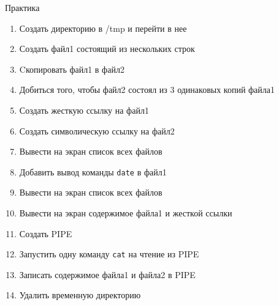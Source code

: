 \documentclass[ignorenonframetext, professionalfonts, hyperref={pdftex, unicode}]{beamer}
\begin{document}
\begin{frame}[fragile]{Практика}
	\begin{enumerate}
		\item Создать директорию в /tmp и перейти в нее
		\item Создать файл1 состоящий из нескольких строк
		\item Cкопировать файл1 в файл2
		\item Добиться того, чтобы файл2 состоял из 3 одинаковых копий файла1
		\item Создать жесткую ссылку на файл1
		\item Создать символическую ссылку на файл2
		\item Вывести на экран список всех файлов
		\item Добавить вывод команды {\tt date} в файл1
		\item Вывести на экран список всех файлов
		\item Вывести на экран содержимое файла1 и жесткой ссылки
		\item Создать PIPE
		\item Запустить одну команду {\tt cat} на чтение из PIPE
		\item Записать содержимое файла1 и файла2 в PIPE
		\item Удалить временную директорию
	\end{enumerate}
\end{frame}
\end{document}
